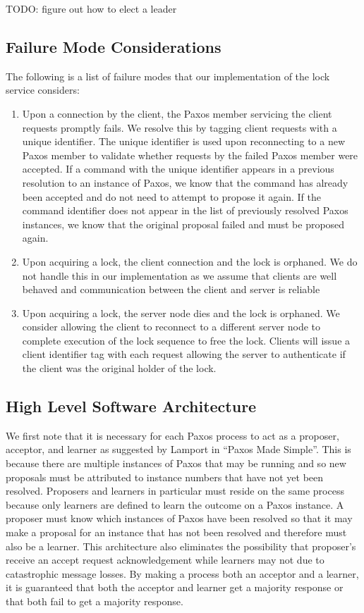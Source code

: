 \documentclass{article}
\begin{document}
TODO: figure out how to elect a leader

\subsection{Failure Mode Considerations}

The following is a list of failure modes that our implementation of the lock service considers:

\begin{enumerate}
\item Upon a connection by the client, the Paxos member servicing the client requests promptly fails. 
  We resolve this by tagging client requests with a unique identifier.
  The unique identifier is used upon reconnecting to a new Paxos member to validate whether requests by the failed Paxos member were accepted.
  If a command with the unique identifier appears in a previous resolution to an instance of Paxos, we know that the command has already been accepted and do not need to attempt to propose it again.
  If the command identifier does not appear in the list of previously resolved Paxos instances, we know that the original proposal failed and must be proposed again.
\item Upon acquiring a lock, the client connection and the lock is orphaned. 
  We do not handle this in our implementation as we assume that clients are well behaved and communication between the client and server is reliable
\item Upon acquiring a lock, the server node dies and the lock is orphaned.
  We consider allowing the client to reconnect to a different server node to complete execution of the lock sequence to free the lock.
  Clients will issue a client identifier tag with each request allowing the server to authenticate if the client was the original holder of the lock.
\end{enumerate}

\subsection{High Level Software Architecture}

We first note that it is necessary for each Paxos process to act as a proposer, acceptor, and learner as suggested by Lamport in ``Paxos Made Simple''.
This is because there are multiple instances of Paxos that may be running and so new proposals must be attributed to instance numbers that have not yet been resolved.
Proposers and learners in particular must reside on the same process because only learners are defined to learn the outcome on a Paxos instance.
A proposer must know which instances of Paxos have been resolved so that it may make a proposal for an instance that has not been resolved and therefore must also be a learner.
This architecture also eliminates the possibility that proposer's receive an accept request acknowledgement while learners may not due to catastrophic message losses.
By making a process both an acceptor and a learner, it is guaranteed that both the acceptor and learner get a majority response or that both fail to get a majority response.
\end{document}
